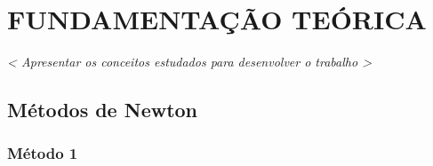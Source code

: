 \chapter{FUNDAMENTAÇÃO TEÓRICA}

\textit{< Apresentar os conceitos estudados para desenvolver o trabalho >}

\section{Métodos de Newton}

\subsection{Método 1}
